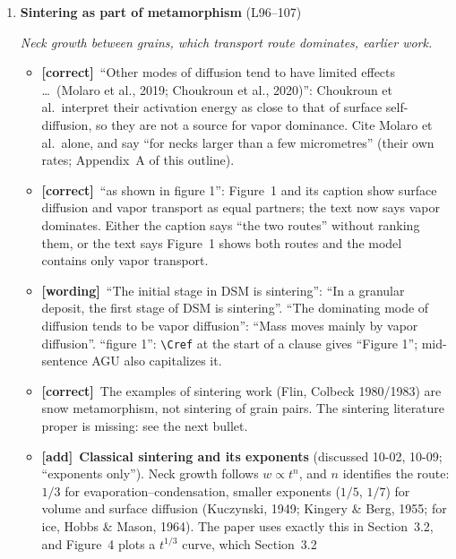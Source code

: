\documentclass[11pt]{article}
\newcommand{\Pg}[3]{\item \textbf{#1} {\small(#2)}\par\textit{#3}}
\newcommand{\tC}{\textcolor{miss}{\textbf{[correct]}}\ }
\newcommand{\tG}{\textcolor{stale}{\textbf{[wording]}}\ }
\newcommand{\tA}{\textcolor{have}{\textbf{[add]}}\ }
\begin{document}
\begin{enumerate}
\begin{itemize}
    the conductivities here are with air at 1~atm and are not on their
    scale. Not in the \texttt{.bib}; DOI \texttt{10.1029/2024JE008615}
    (Crossref: JGR Planets 129(12), e2024JE008615).
  \item Kempf et al.\ (2010) and Southworth et al.\ (2019) are cited as
    Choukroun et al.\ cite them; both are in the \texttt{.bib}
    (\texttt{kempfHowEnceladusDust2010},
    \texttt{southworthSurfaceDepositionEnceladus2019}).
  \end{itemize}
\Pg{Sintering as part of metamorphism}{L96--107}{Neck growth between grains, which transport route dominates, earlier work.}
  \begin{itemize}
  \item \tC ``Other modes of diffusion tend to have limited effects \ldots\
    (Molaro et al., 2019; Choukroun et al., 2020)'': Choukroun et al.\
    interpret their activation energy as close to that of surface
    self-diffusion, so they are not a source for vapor dominance. Cite
    Molaro et al.\ alone, and say ``for necks larger than a few
    micrometres'' (their own rates; Appendix~A of this outline).
  \item \tC ``as shown in figure 1'': Figure~1 and its caption show surface
    diffusion and vapor transport as equal partners; the text now says vapor
    dominates. Either the caption says ``the two routes'' without ranking
    them, or the text says Figure~1 shows both routes and the model
    contains only vapor transport.
  \item \tG ``The initial stage in DSM is sintering'': ``In a granular
    deposit, the first stage of DSM is sintering''. ``The dominating mode of
    diffusion tends to be vapor diffusion'': ``Mass moves mainly by vapor
    diffusion''. ``figure 1'': \verb|\Cref| at the start of a clause
    gives ``Figure 1''; mid-sentence AGU also capitalizes it.
  \item \tC The examples of sintering work (Flin, Colbeck 1980/1983) are
    snow metamorphism, not sintering of grain pairs. The sintering
    literature proper is missing: see the next bullet.
  \item \tA \textbf{Classical sintering and its exponents} (discussed 10-02,
    10-09; ``exponents only''). Neck growth follows $w \propto t^{n}$, and
    $n$ identifies the route: $1/3$ for evaporation--condensation, smaller
    exponents ($1/5$, $1/7$) for volume and surface diffusion (Kuczynski, 1949; Kingery \&
    Berg, 1955; for ice, Hobbs \& Mason, 1964). The paper uses exactly this
    in Section~3.2, and Figure~4 plots a $t^{1/3}$ curve, which Section~3.2

\end{itemize}
\end{enumerate}
\end{document}
